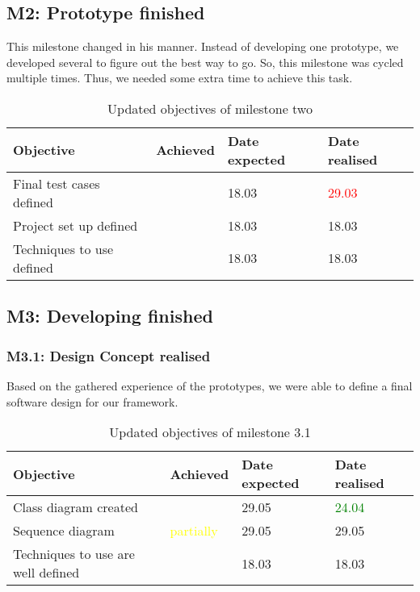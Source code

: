 \subsection{M2: Prototype finished}
This milestone changed in his manner. Instead of developing one prototype, we developed several to figure out the best way to go. So, this milestone was cycled multiple times. Thus, we needed some extra time to achieve this task.

\begin{table}[H]
	\centering
	\begin{tabular}{|p{}|p{}|p{}|p{}|}
		\hline 
		\bfseries Objective & \bfseries Achieved & \bfseries Date expected  & \bfseries Date realised \\ 
		\hline
		\hline 
		Final test cases defined  	& \tick & 18.03	&	\textcolor{red}{29.03}	 \\
		\hline 
		Project set up defined  	& \tick & 18.03	&	18.03	 \\
		\hline 
		Techniques to use defined  	& \tick & 18.03	&	18.03	 \\
		\hline 
	\end{tabular}
	\caption{Updated objectives of milestone two}
\end{table}

\subsection{M3: Developing finished}

\subsubsection{M3.1: Design Concept realised}
\label{sec:M31}
Based on the gathered experience of the prototypes, we were able to define a final software design for our framework.

\begin{table}[H]
	\centering
	\begin{tabular}{|p{}|p{}|p{}|p{}|}
		\hline 
		\bfseries Objective & \bfseries Achieved & \bfseries Date expected  & \bfseries Date realised \\ 
		\hline
		\hline 
		Class diagram created			& \tick				& 29.05		& \textcolor{green}{24.04} \\
		\hline 
		Sequence diagram  			& \textcolor{yellow}{partially}\footnotemark[1]	& 29.05		& 29.05 \\
		\hline 
		Techniques to use are well defined  	& \tick				& 18.03		& 18.03	\\
		\hline 
	\end{tabular}
	\caption{Updated objectives of milestone 3.1}
\end{table}


